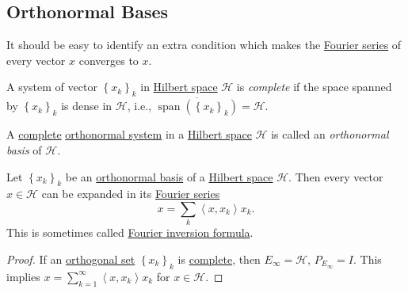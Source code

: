 \subsection{Orthonormal Bases}
It should be easy to identify an extra condition which makes the \hyperref[def:Fourier-series]{Fourier series} of every vector \(x\) converges to \(x\).

\begin{definition}\label{def:complete-system}
	A system of vector \(\left\{ x_k\right\}_k\) in \hyperref[def:Hilbert-space]{Hilbert space} \(\mathcal{H} \) is \emph{complete} if the space spanned by \(\left\{ x_k\right\}_k\) is dense in \(\mathcal{H} \), i.e., \(\overline{\mathop{\mathrm{span}}(\left\{ x_k \right\} _k)} = \mathcal{H} \).
\end{definition}

\begin{definition}\label{def:orthonormal-basis}
	A \hyperref[def:complete-system]{complete} \hyperref[def:orthonormal-system]{orthonormal system} in a \hyperref[def:Hilbert-space]{Hilbert space} \(\mathcal{H} \) is called an \emph{orthonormal basis} of \(\mathcal{H} \).
\end{definition}

\begin{theorem}\label{thm:Fourier-expansion}
	Let \(\left\{ x_k \right\} _k\) be an \hyperref[def:orthonormal-basis]{orthonormal basis} of a \hyperref[def:Hilbert-space]{Hilbert space} \(\mathcal{H} \). Then every vector \(x\in \mathcal{H} \) can be expanded in its \hyperref[def:Fourier-series]{Fourier series}
	\[
		x = \sum_{k} \left\langle x, x_k \right\rangle x_k.
	\]
	This is sometimes called \href{https://en.wikipedia.org/wiki/Fourier_inversion_theorem}{Fourier inversion formula}.
\end{theorem}
\begin{proof}
	If an \hyperref[def:orthogonal-system]{orthogonal set} \(\left\{ x_{k} \right\}_k \) is \hyperref[def:complete-system]{complete}, then \(E_\infty = \mathcal{H} \), \(P_{E_\infty } = I\). This implies \(x = \sum_{k=1}^{\infty} \left\langle x, x_{k}  \right\rangle x_{k}\) for \(x\in \mathcal{H} \).
\end{proof}

